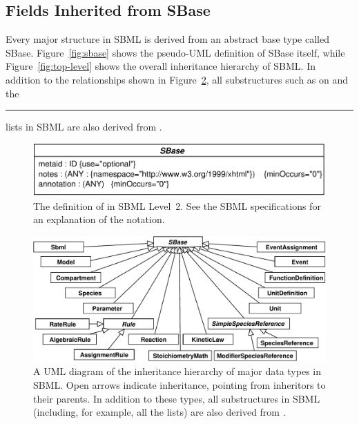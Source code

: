 \documentclass{sbmlmanual}
\begin{document}



\subsection{Fields Inherited from SBase}
\label{sec:inherited-from-sbase}

Every major structure in SBML is derived from an abstract base type called
SBase.  Figure~\vref{fig:sbase} shows the pseudo-UML definition of SBase
itself, while Figure~\vref{fig:top-level} shows the overall inheritance
hierarchy of SBML.  In addition to the relationships shown in
Figure~\ref{fig:top-level}, all substructures such as  on
 and the \rule{0.5in}{0.5pt} lists in SBML are
also derived from .

\begin{figure}[hbt]
  \centering
  \includegraphics[scale = 0.7]{sbase}
  \caption{The definition of  in SBML Level~2.  See the SBML
    specifications for an explanation of the notation.}
  \label{fig:sbase}
\end{figure}


\begin{figure}[hbt]
  \centering
  \includegraphics[scale = 0.7]{top-level}
  \caption{A UML diagram of the inheritance hierarchy of major data types
    in SBML.  Open arrows indicate inheritance, pointing from inheritors to
    their parents.  In addition to these types, all substructures in SBML
    (including, for example, all the  lists) are also derived
    from .}
  \label{fig:top-level}
\end{figure}
\end{document}
